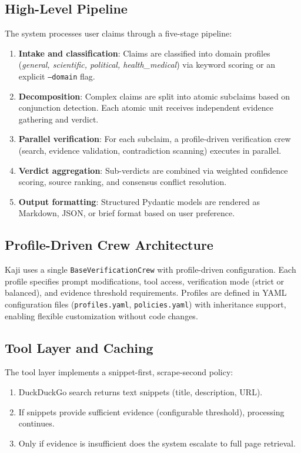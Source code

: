 \documentclass[conference]{IEEEtran}
\begin{document}
\subsection{High-Level Pipeline}

The system processes user claims through a five-stage pipeline:

\begin{enumerate}
    \item \textbf{Intake and classification}: Claims are classified into domain profiles (\textit{general, scientific, political, health\_medical}) via keyword scoring or an explicit \texttt{--domain} flag.
    \item \textbf{Decomposition}: Complex claims are split into atomic subclaims based on conjunction detection. Each atomic unit receives independent evidence gathering and verdict.
    \item \textbf{Parallel verification}: For each subclaim, a profile-driven verification crew (search, evidence validation, contradiction scanning) executes in parallel.
    \item \textbf{Verdict aggregation}: Sub-verdicts are combined via weighted confidence scoring, source ranking, and consensus conflict resolution.
    \item \textbf{Output formatting}: Structured Pydantic models are rendered as Markdown, JSON, or brief format based on user preference.
\end{enumerate}

\subsection{Profile-Driven Crew Architecture}

Kaji uses a single \texttt{BaseVerificationCrew} with profile-driven configuration. Each profile specifies prompt modifications, tool access, verification mode (strict or balanced), and evidence threshold requirements. Profiles are defined in YAML configuration files (\texttt{profiles.yaml}, \texttt{policies.yaml}) with inheritance support, enabling flexible customization without code changes.

\subsection{Tool Layer and Caching}

The tool layer implements a snippet-first, scrape-second policy:

\begin{enumerate}
    \item DuckDuckGo search returns text snippets (title, description, URL).
    \item If snippets provide sufficient evidence (configurable threshold), processing continues.
    \item Only if evidence is insufficient does the system escalate to full page retrieval.
\end{enumerate}
\end{document}
